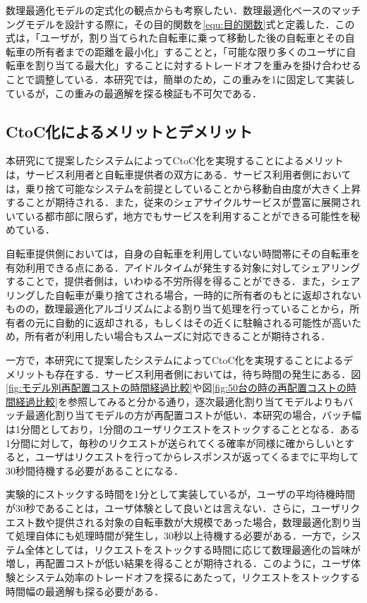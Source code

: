       \par 数理最適化モデルの定式化の観点からも考察したい．数理最適化ベースのマッチングモデルを設計する際に，その目的関数を\ref{equ:目的関数}式と定義した．この式は，「ユーザが，割り当てられた自転車に乗って移動した後の自転車とその自転車の所有者までの距離を最小化」することと，「可能な限り多くのユーザに自転車を割り当てる最大化」することに対するトレードオフを重みを掛け合わせることで調整している．本研究では，簡単のため，この重みを1に固定して実装しているが，この重みの最適解を探る検証も不可欠である．
      
  \subsection{CtoC化によるメリットとデメリット}
    \label{sec:CtoC化によるメリットとデメリット}
      \par 本研究にて提案したシステムによってCtoC化を実現することによるメリットは，サービス利用者と自転車提供者の双方にある．サービス利用者側においては，乗り捨て可能なシステムを前提としていることから移動自由度が大きく上昇することが期待される．また，従来のシェアサイクルサービスが豊富に展開されいている都市部に限らず，地方でもサービスを利用することができる可能性を秘めている．
      \par 自転車提供側においては，自身の自転車を利用していない時間帯にその自転車を有効利用できる点にある．アイドルタイムが発生する対象に対してシェアリングすることで，提供者側は，いわゆる不労所得を得ることができる．また，シェアリングした自転車が乗り捨てされる場合，一時的に所有者のもとに返却されないものの，数理最適化アルゴリズムによる割り当て処理を行っていることから，所有者の元に自動的に返却される，もしくはその近くに駐輪される可能性が高いため，所有者が利用したい場合もスムーズに対応できることが期待される．
      \par 一方で，本研究にて提案したシステムによってCtoC化を実現することによるデメリットも存在する．サービス利用者側においては，待ち時間の発生にある．図\ref{fig:モデル別再配置コストの時間経過比較}や図\ref{fig:50台の時の再配置コストの時間経過比較}を参照してみると分かる通り，逐次最適化割り当てモデルよりもバッチ最適化割り当てモデルの方が再配置コストが低い．本研究の場合，バッチ幅は1分間としており，1分間のユーザリクエストをストックすることとなる．ある1分間に対して，毎秒のリクエストが送られてくる確率が同様に確からしいとすると，ユーザはリクエストを行ってからレスポンスが返ってくるまでに平均して30秒間待機する必要があることになる．
      \par 実験的にストックする時間を1分として実装しているが，ユーザの平均待機時間が30秒であることは，ユーザ体験として良いとは言えない．さらに，ユーザリクエスト数や提供される対象の自転車数が大規模であった場合，数理最適化割り当て処理自体にも処理時間が発生し，30秒以上待機する必要がある．一方で，システム全体としては，リクエストをストックする時間に応じて数理最適化の旨味が増し，再配置コストが低い結果を得ることが期待される．このように，ユーザ体験とシステム効率のトレードオフを探るにあたって，リクエストをストックする時間幅の最適解も探る必要がある．

